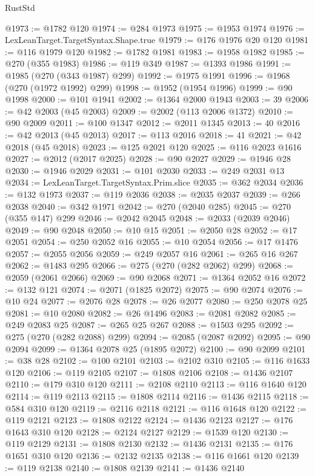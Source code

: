 \begin{lexlean}{RustStd}
\begin{coremodule}
@1973 := @1782 @120
@1974 := @284 @1973
@1975 := @1953 @1974
@1976 := LexLeanTarget.TargetSyntax.Shape.true
@1979 := @176 @1976 @20 @120
@1981 := @116 @1979 @120
@1982 := @1782 @1981
@1983 := @1958 @1982
@1985 := @270 (@355 @1983)
@1986 := @119 @349
@1987 := @1393 @1986
@1991 := @1985 (@270 (@343 @1987) @299)
@1992 := @1975 @1991
@1996 := @1968 (@270 (@1972 @1992) @299)
@1998 := @1952 (@1954 @1996)
@1999 := @90 @1998
@2000 := @101 @1941
@2002 := @1364 @2000 @1943
@2003 := 39
@2006 := @42 @2003 (@45 @2003)
@2009 := @2002 (@113 @2006 @1372)
@2010 := @90 @2009
@2011 := @100 @1347
@2012 := @2011 @1345
@2013 := 40
@2016 := @42 @2013 (@45 @2013)
@2017 := @113 @2016
@2018 := 41
@2021 := @42 @2018 (@45 @2018)
@2023 := @125 @2021 @120
@2025 := @116 @2023 @1616
@2027 := @2012 (@2017 @2025)
@2028 := @90 @2027
@2029 := @1946 @28
@2030 := @1946 @2029
@2031 := @101 @2030
@2033 := @249 @2031 @13
@2034 := LexLeanTarget.TargetSyntax.Prim.slice
@2035 := @362 @2034
@2036 := @132 @1973
@2037 := @119 @2036
@2038 := @2035 @2037
@2039 := @266 @2038
@2040 := @342 @1971
@2042 := @270 (@2040 @285)
@2045 := @270 (@355 @147) @299
@2046 := @2042 @2045
@2048 := @2033 (@2039 @2046)
@2049 := @90 @2048
@2050 := @10 @15
@2051 := @2050 @28
@2052 := @17 @2051
@2054 := @250 @2052 @16
@2055 := @10 @2054
@2056 := @17 @1476
@2057 := @2055 @2056
@2059 := @249 @2057 @16
@2061 := @265 @16 @267
@2062 := @1483 @295
@2066 := @275 (@270 (@282 @2062) @299)
@2068 := @2059 (@2061 @2066)
@2069 := @90 @2068
@2071 := @1364 @2052 @16
@2072 := @132 @121
@2074 := @2071 (@1825 @2072)
@2075 := @90 @2074
@2076 := @10 @24
@2077 := @2076 @28
@2078 := @26 @2077
@2080 := @250 @2078 @25
@2081 := @10 @2080
@2082 := @26 @1496
@2083 := @2081 @2082
@2085 := @249 @2083 @25
@2087 := @265 @25 @267
@2088 := @1503 @295
@2092 := @275 (@270 (@282 @2088) @299)
@2094 := @2085 (@2087 @2092)
@2095 := @90 @2094
@2099 := @1364 @2078 @25 (@1895 @2072)
@2100 := @90 @2099
@2101 := @38 @28
@2102 := @100 @2101
@2103 := @2102 @310
@2105 := @116 @1633 @120
@2106 := @119 @2105
@2107 := @1808 @2106
@2108 := @1436 @2107
@2110 := @179 @310 @120
@2111 := @2108 @2110
@2113 := @116 @1640 @120
@2114 := @119 @2113
@2115 := @1808 @2114
@2116 := @1436 @2115
@2118 := @584 @310 @120
@2119 := @2116 @2118
@2121 := @116 @1648 @120
@2122 := @119 @2121
@2123 := @1808 @2122
@2124 := @1436 @2123
@2127 := @176 @1643 @310 @120
@2128 := @2124 @2127
@2129 := @1539 @120
@2130 := @119 @2129
@2131 := @1808 @2130
@2132 := @1436 @2131
@2135 := @176 @1651 @310 @120
@2136 := @2132 @2135
@2138 := @116 @1661 @120
@2139 := @119 @2138
@2140 := @1808 @2139
@2141 := @1436 @2140

\end{coremodule}
\end{lexlean}
